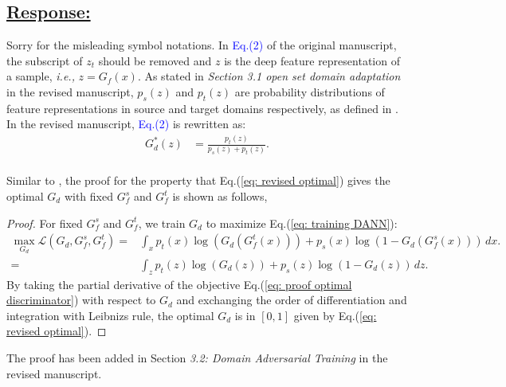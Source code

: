 \subsection*{\underline{\textbf{Response:}}}

Sorry for the misleading symbol notations.
In \textcolor{blue}{Eq.(2)} of the original manuscript, the subscript of $z_t$ should be removed and $z$ is the deep feature representation of a sample, \textit{i.e.,} $z=G_f(x).$
As stated in \textit{Section 3.1 open set domain adaptation} in the revised manuscript, $p_s (z)$ and $p_t (z)$ are probability distributions of feature representations in source and target domains respectively, as defined in \cite{PartialDA-iw}.
In the revised manuscript, \textcolor{blue}{Eq.(2)} is rewritten as:
\begin{equation}
    \label{eq: revised optimal}
    \begin{split}
        G_d^*(z) &= \frac{p_t(z)}{p_s(z)+p_t(z)}. \\
    \end{split}
\end{equation}

Similar to \cite{goodfellow2014generative}, the proof for the property that Eq.(\ref{eq: revised optimal}) gives the optimal $G_d$ with fixed $G_f^s$ and $G_f^t$ is shown as follows,
\begin{proof}
    For fixed $G_f^s$ and $G_f^t$, we train $G_d$ to maximize Eq.(\ref{eq: training DANN}):
    \begin{equation}
        \label{eq: proof optimal discriminator}
        \begin{split}
            \max_{G_d} \mathscr{L}(G_d,G^{s}_{f},G_f^t)  = &\int_x p_t(x)\log \left(G_d\left(G_f^t\left(x\right)\right)\right)
              + p_s(x) \log\left(1-G_d\left(G_f^s\left(x\right)\right)\right) \, dx.
            \\ = &\int_z p_t(z)\log \left(G_d\left(z\right)\right)
              + p_s(z) \log\left(1-G_d\left(z\right)\right) \, dz.
        \end{split}
    \end{equation}
    By taking the partial derivative of the objective Eq.(\ref{eq: proof optimal discriminator}) with respect to $G_d$ and exchanging the order of differentiation and integration with Leibnizs rule, the optimal $G_d$ is in $[0, 1]$ given by Eq.(\ref{eq: revised optimal}).
\end{proof}

The proof has been added in Section \textit{3.2: Domain Adversarial Training} in the revised manuscript.

